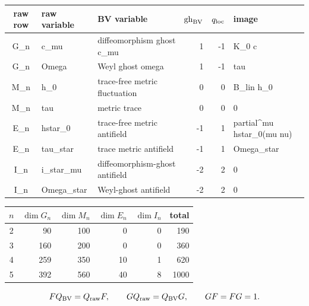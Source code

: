 \begin{tabular}{c|l|l|r|r|l}
raw row & raw variable & BV variable & $\operatorname{gh}_{\rm BV}$ & $q_{\rm loc}$ & image \\
\hline
G_n & c\_mu & diffeomorphism ghost c\_mu & 1 & -1 & K\_0 c \\
G_n & Omega & Weyl ghost omega & 1 & -1 & tau \\
M_n & h\_0 & trace-free metric fluctuation & 0 & 0 & B\_lin h\_0 \\
M_n & tau & metric trace & 0 & 0 & 0 \\
E_n & hstar\_0 & trace-free metric antifield & -1 & 1 & partial^mu hstar\_0(mu nu) \\
E_n & tau\_star & trace metric antifield & -1 & 1 & Omega\_star \\
I_n & i\_star\_mu & diffeomorphism-ghost antifield & -2 & 2 & 0 \\
I_n & Omega\_star & Weyl-ghost antifield & -2 & 2 & 0 \\
\end{tabular}

\begin{tabular}{c|rrrr|r}
$n$ & $\dim G_n$ & $\dim M_n$ & $\dim E_n$ & $\dim I_n$ & total \\
\hline
2 & 90 & 100 & 0 & 0 & 190 \\
3 & 160 & 200 & 0 & 0 & 360 \\
4 & 259 & 350 & 10 & 1 & 620 \\
5 & 392 & 560 & 40 & 8 & 1000 \\
\end{tabular}

\[
 FQ_{\rm BV}=Q_{\rm raw}F,\qquad
 GQ_{\rm raw}=Q_{\rm BV}G,\qquad
 GF=FG=1.
\]
